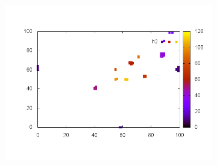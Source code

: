 \documentclass[10pt,a4paper]{article}
\begin{document}
\begin{figure}
\begin{subfigure}[b]{1\textwidth}
\includegraphics[scale=.3]{./img/SCC_Stable3/cut90p/2.png}
\end{subfigure}


\end{figure}
\end{document}
